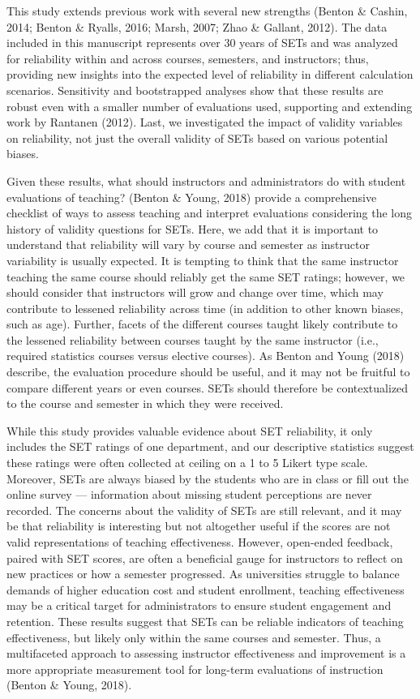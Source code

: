 \documentclass[
  man]{apa7}
\begin{document}
This study extends previous work with several new strengths (Benton \& Cashin, 2014; Benton \& Ryalls, 2016; Marsh, 2007; Zhao \& Gallant, 2012). The data included in this
manuscript represents over 30 years of SETs and was analyzed for
reliability within and across courses, semesters, and instructors; thus,
providing new insights into the expected level of reliability in
different calculation scenarios. Sensitivity and bootstrapped analyses
show that these results are robust even with a smaller number of
evaluations used, supporting and extending work by Rantanen (2012). Last,
we investigated the impact of validity variables on reliability, not
just the overall validity of SETs based on various potential biases.

Given these results, what should instructors and administrators do with
student evaluations of teaching? (Benton \& Young, 2018) provide a comprehensive
checklist of ways to assess teaching and interpret evaluations
considering the long history of validity questions for SETs. Here, we
add that it is important to understand that reliability will vary by
course and semester as instructor variability is usually expected. It is
tempting to think that the same instructor teaching the same course
should reliably get the same SET ratings; however, we should consider
that instructors will grow and change over time, which may contribute to
lessened reliability across time (in addition to other known biases,
such as age). Further, facets of the different courses taught likely
contribute to the lessened reliability between courses taught by the
same instructor (i.e., required statistics courses versus elective
courses). As Benton and Young (2018) describe, the evaluation procedure should be
useful, and it may not be fruitful to compare different years or even
courses. SETs should therefore be contextualized to the course and
semester in which they were received.

While this study provides valuable evidence about SET reliability, it
only includes the SET ratings of one department, and our descriptive
statistics suggest these ratings were often collected at ceiling on a 1
to 5 Likert type scale. Moreover, SETs are always biased by the students
who are in class or fill out the online survey --- information about
missing student perceptions are never recorded. The concerns about the
validity of SETs are still relevant, and it may be that reliability is
interesting but not altogether useful if the scores are not valid
representations of teaching effectiveness. However, open-ended feedback,
paired with SET scores, are often a beneficial gauge for instructors to
reflect on new practices or how a semester progressed. As universities
struggle to balance demands of higher education cost and student
enrollment, teaching effectiveness may be a critical target for
administrators to ensure student engagement and retention. These results
suggest that SETs can be reliable indicators of teaching effectiveness,
but likely only within the same courses and semester. Thus, a
multifaceted approach to assessing instructor effectiveness and
improvement is a more appropriate measurement tool for long-term
evaluations of instruction (Benton \& Young, 2018).
\end{document}
